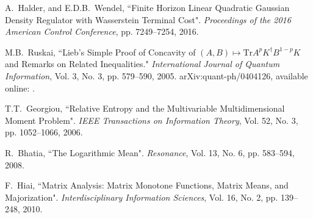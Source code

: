 \documentclass[letterpaper,10pt,twocolumn,conference]{ieeeconf}
\begin{document}
\begin{thebibliography}{99}

A.~Halder, and E.D.B.~Wendel, ``Finite Horizon Linear Quadratic Gaussian Density Regulator with Wasserstein Terminal Cost". \emph{Proceedings of the 2016 American Control Conference}, pp. 7249--7254, 2016.


M.B.~Ruskai, ``Lieb's Simple Proof of Concavity of $(A,B) \mapsto \mathrm{Tr} A^{p}K^{\dagger}B^{1-p}K$ and Remarks on Related Inequalities." \emph{International Journal of Quantum Information}, Vol. 3, No. 3, pp. 579--590, 2005. arXiv:quant-ph/0404126, available online: .

T.T.~Georgiou, ``Relative Entropy and the Multivariable
Multidimensional Moment Problem". \emph{IEEE Transactions on Information Theory}, Vol. 52, No. 3, pp. 1052--1066, 2006.

R.~Bhatia, ``The Logarithmic Mean". \emph{Resonance}, Vol. 13, No. 6, pp. 583--594, 2008.

F.~Hiai, ``Matrix Analysis: Matrix Monotone Functions, Matrix Means, and Majorization". \emph{Interdisciplinary Information Sciences}, Vol. 16, No. 2, pp. 139--248, 2010.


\end{thebibliography}
\end{document}

